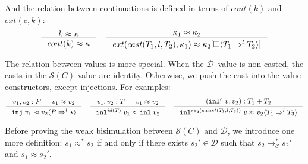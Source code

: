 \documentclass[acmsmall,review,anonymous]{acmart}\settopmatter{printfolios=true,printccs=false,printacmref=false}
\newcommand{\plus}[0]{+}
\newcommand{\TOOdyn}[0]{\star}
\newcommand{\POOfun}[2]{#1 \shortrightarrow #2}
\newcommand{\POOprod}[2]{#1 \times #2}
\newcommand{\POOsum}[2]{#1 \plus #2}
\newcommand{\cOOcast}[3]{#1 \Rightarrow^{#2} #3}
\newcommand{\vOOcast}[2]{#1\langle#2\rangle}
\newcommand{\vOOfun}[3]{\mathtt{fun} \; #1 \; #2 \; #3}
\newcommand{\vOOinl}[1]{\mathtt{inl}\;#1}
\newcommand{\kOOcast}[2]{
	#2[\square \langle #1 \rangle]}
\newcommand{\hcvOOinj}[2]{\mathtt{inj} \; #2}
\newcommand{\hcvOOfun}[5]{\mathtt{fun}^{\POOfun{#1}{#5}} \; #2 \; #3 \; #4}
\newcommand{\hcvOOcons}[4]{\mathtt{cons}^{\POOprod{#2}{#4}}\;#1\;#3}
\newcommand{\hcvOOinl}[2]{\mathtt{inl}^{#2}\;#1}
\newcommand{\judgeCreduceTrans}[2]{#1 \longmapsto_{\mathcal{C}}^{*} #2}
\newcommand{\ineffCEKD}{$\mathcal{D}$}
\newcommand{\effCEK}[1]{$\mathcal{S}(#1)$}
\begin{document}
And the relation between continuations is defined in terms of $cont(k)$ and 
$ext(c,k) $: \begin{gather*}
\inference{
	k \approx \kappa
}{
	cont(k) \approx \kappa
}
\quad
\inference{
	\kappa_1 \approx \kappa_2
}{
	ext(cast(T_1,l,T_2),\kappa_1)
	\approx
	\kOOcast{\cOOcast{T_1}{l}{T_2}}{\kappa_2} 
}
\end{gather*}

The relation between values is more special. When the \ineffCEKD\ value is 
non-casted, the casts in the \effCEK{C} value are identity. Otherwise, we push 
the cast into the value constructors, except injections. For examples: 
\begin{gather*}
\inference{
	v_1, v_2 : P &
	v_1 \approx v_2
}{
	\hcvOOinj{P_1}{v_1} \approx \vOOcast{v_2}{\cOOcast{P}{l}{\TOOdyn}}
}
\quad
\inference{
	v_1, v_2 : T &
	v_1 \approx v_2
}{
	\hcvOOinl{v_1}{id(T)} \approx \vOOinl{v_2}
}
\quad
\inference{
	(\hcvOOinl{v}{c}, v_2) : \POOsum{T_1}{T_2}
}{
	\hcvOOinl{v}{seq(c,cast(T_1,l,T_3))} \approx 
	\vOOcast{v_2}{\cOOcast{T_1}{l}{T_3}}
}
\end{gather*}

Before proving the weak bisimulation between \effCEK{C} and \ineffCEKD, we 
introduce one more definition: $s_1 \approx^{*} s_2$ if and only if there 
exists $s_2' \in \text{\ineffCEKD}$
such that $\judgeCreduceTrans{s_2}{s_2'}$ and $s_1 \approx s_2'$.
\end{document}
